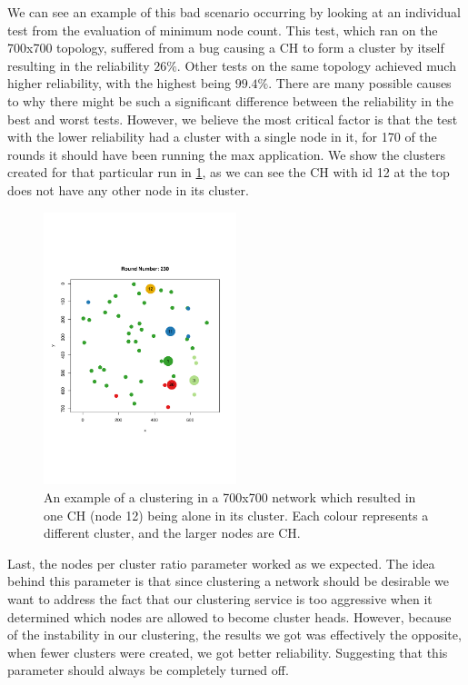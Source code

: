We can see an example of this bad scenario occurring by looking at an individual test from the evaluation of minimum node count. This test, which ran on the 700x700 topology, suffered from a bug causing a CH to form a cluster by itself resulting in the reliability $26\%$. Other tests on the same topology achieved much higher reliability, with the highest being $99.4\%$. There are many possible causes to why there might be such a significant difference between the reliability in the best and worst tests. However, we believe the most critical factor is that the test with the lower reliability had a cluster with a single node in it, for 170 of the rounds it should have been running the max application. We show the clusters created for that particular run in \cref{fig:min-node-count-example}, as we can see the CH with id 12 at the top does not have any other node in its cluster.

\begin{figure}[bt]
    \centering
    \includegraphics[width=0.5\textwidth]{figure/Results/Discussion/MinNodeCountExample.pdf}
    \caption{An example of a clustering in a 700x700 network which resulted in one CH (node 12) being alone in its cluster. Each colour represents a different cluster, and the larger nodes are CH.}
    \label{fig:min-node-count-example}
\end{figure}

Last, the nodes per cluster ratio parameter worked as we expected. The idea behind this parameter is that since clustering a network should be desirable we want to address the fact that our clustering service is too aggressive when it determined which nodes are allowed to become cluster heads. However, because of the instability in our clustering, the results we got was effectively the opposite, when fewer clusters were created, we got better reliability. Suggesting that this parameter should always be completely turned off.

